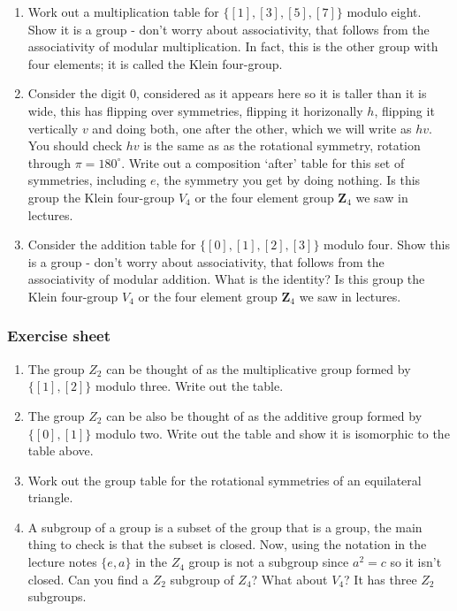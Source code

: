 \documentclass[12pt]{article}
\begin{document}
\begin{enumerate}
\item Work out a multiplication table for $\{[1],[3],[5],[7]\}$ modulo eight. Show it is a group - don't worry about associativity, that follows from the associativity of modular multiplication. In fact, this is the other group with four elements; it is called the Klein four-group.
\item Consider the digit 0, considered as it appears here so it is
  taller than it is wide, this has flipping over symmetries, flipping
  it horizonally $h$, flipping it vertically $v$ and doing both, one
  after the other, which we will write as $hv$. You should check $hv$
  is the same as as the rotational symmetry, rotation through
  $\pi=180^\circ$. Write out a composition \lq{}after\rq{} table for
  this set of symmetries, including $e$, the symmetry you get by doing
  nothing. Is this group the Klein four-group $V_4$ or the four
  element group $\mathbf{Z}_4$ we saw in lectures.
\item Consider the addition table for $\{[0],[1],[2],[3]\}$ modulo four. Show this is a group -   don't worry about associativity, that follows from the associativity of modular addition. What is the identity? Is this group the Klein four-group $V_4$ or the four element group $\mathbf{Z}_4$ we saw in lectures.

\end{enumerate}


\subsubsection*{Exercise sheet}

\begin{enumerate}
\item The group $Z_2$ can be thought of as the multiplicative group formed by $\{[1],[2]\}$ modulo three. Write out the table.
\item The group $Z_2$ can be also be thought of as the additive group
  formed by $\{[0],[1]\}$ modulo two. Write out the table and show it
  is isomorphic to the table above.
\item Work out the group table for the rotational symmetries of an
  equilateral triangle.
\item A subgroup of a group is a subset of the group that is a group,
  the main thing to check is that the subset is closed. Now, using the
  notation in the lecture notes $\{e,a\}$ in the $Z_4$ group is not a
  subgroup since $a^2=c$ so it isn't closed. Can you find a $Z_2$
  subgroup of $Z_4$? What about $V_4$? It has three $Z_2$ subgroups.
\end{enumerate}
\end{document}
